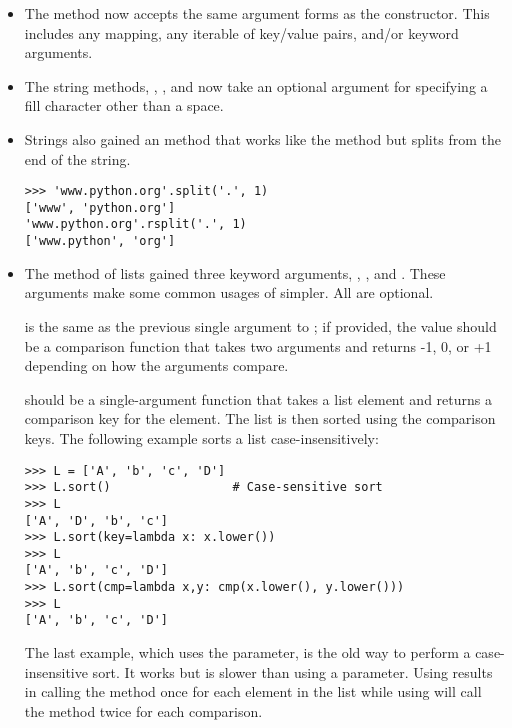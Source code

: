 \documentclass{howto}
\begin{document}
\begin{itemize}

\item The  method now accepts the same
argument forms as the  constructor.  This includes any
mapping, any iterable of key/value pairs, and/or keyword arguments.       

\item The string methods, , , and
 now take an optional argument for specifying a
fill character other than a space.

\item Strings also gained an  method that
works like the  method but splits from the end of
the string.  

\begin{verbatim}
>>> 'www.python.org'.split('.', 1)
['www', 'python.org']
'www.python.org'.rsplit('.', 1)
['www.python', 'org']        
\end{verbatim}      

\item The  method of lists gained three keyword
arguments, , , and .  These arguments
make some common usages of  simpler.  All are optional.

 is the same as the previous single argument to
; if provided, the value should be a comparison
function that takes two arguments and returns -1, 0, or +1 depending
on how the arguments compare.  

 should be a single-argument function that takes a list
element and returns a comparison key for the element.  The list is
then sorted using the comparison keys.  The following example sorts a
list case-insensitively:

\begin{verbatim}
>>> L = ['A', 'b', 'c', 'D']
>>> L.sort()                 # Case-sensitive sort
>>> L
['A', 'D', 'b', 'c']
>>> L.sort(key=lambda x: x.lower())
>>> L
['A', 'b', 'c', 'D']
>>> L.sort(cmp=lambda x,y: cmp(x.lower(), y.lower()))
>>> L
['A', 'b', 'c', 'D']
\end{verbatim}

The last example, which uses the  parameter, is the old way
to perform a case-insensitive sort.  It works but is slower than
using a  parameter.  Using  results in calling the
 method once for each element in the list while using
 will call the method twice for each comparison.


\end{itemize}
\end{document}
